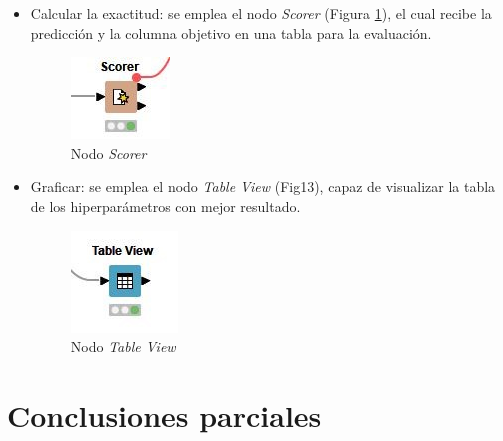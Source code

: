 \begin{itemize}
	\item Calcular la exactitud: se emplea el nodo \textit{Scorer} (Figura \ref{fig:nodo-scorer}), el cual recibe la predicción y la columna objetivo en una tabla para la evaluación. 
	\begin{figure}[H]
		\centering
		\includegraphics[width=0.15\linewidth]{"figuras/capi 2/nodo-scorer"}
		\caption[Nodo Scorer]{Nodo \textit{Scorer}}
		\label{fig:nodo-scorer}
	\end{figure}
	
	\item Graficar: se emplea el nodo \textit{Table View} (Fig13), capaz de visualizar la tabla de los hiperparámetros con mejor resultado.
	\begin{figure}[H]
		\centering
		\includegraphics[width=0.15\linewidth]{"figuras/capi 2/nodo-table-view"}
		\caption[Nodo Table View]{Nodo \textit{Table View}}
		\label{fig:nodo-table-view}
	\end{figure}
	
\end{itemize}

\section{Conclusiones parciales}
\pagebreak

